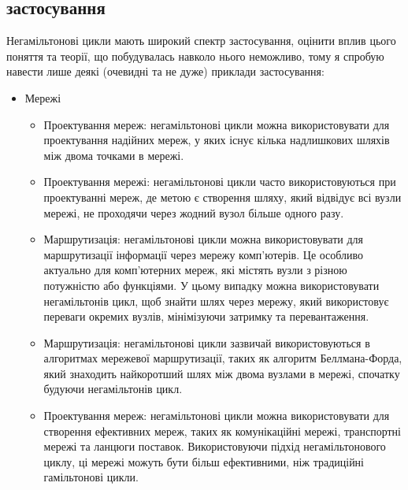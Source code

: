 \documentclass[14pt]{article}
\begin{document}
\begin{spacing}{1.175}
    \section{ застосування}
    Негамільтонові цикли мають широкий спектр застосування, оцінити вплив цього поняття та теорії, що побудувалась навколо нього неможливо, тому я спробую навести лише деякі (очевидні та не дуже) приклади застосування:
    \begin{itemize}
       
        \item Мережі
        \begin{itemize}
            
            \item Проектування мереж: негамільтонові цикли можна використовувати для проектування надійних мереж, у яких існує кілька надлишкових шляхів між двома точками в мережі.
        
            \item Проектування мережі: негамільтонові цикли часто використовуються при проектуванні мереж, де метою є створення шляху, який відвідує всі вузли мережі, не проходячи через жодний вузол більше одного разу.
        
            \item Маршрутизація: негамільтонові цикли можна використовувати для маршрутизації інформації через мережу комп’ютерів. Це особливо актуально для комп’ютерних мереж, які містять вузли з різною потужністю або функціями. У цьому випадку можна використовувати негамільтонів цикл, щоб знайти шлях через мережу, який використовує переваги окремих вузлів, мінімізуючи затримку та перевантаження.
        
            \item Маршрутизація: негамільтонові цикли зазвичай використовуються в алгоритмах мережевої маршрутизації, таких як алгоритм Беллмана-Форда, який знаходить найкоротший шлях між двома вузлами в мережі, спочатку будуючи негамільтонів цикл.
            
            \item Проектування мереж: негамільтонові цикли можна використовувати для створення ефективних мереж, таких як комунікаційні мережі, транспортні мережі та ланцюги поставок. Використовуючи підхід негамільтонового циклу, ці мережі можуть бути більш ефективними, ніж традиційні гамільтонові цикли.
            
        \end{itemize}



\end{itemize}
\end{spacing}
\end{document}
